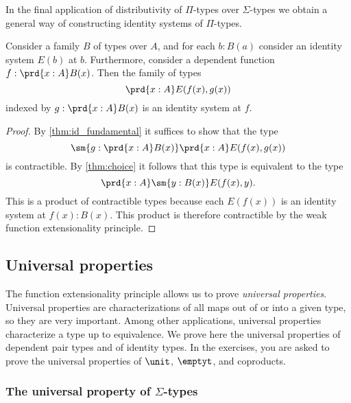 In the final application of distributivity of $\Pi$-types over $\Sigma$-types we obtain a general way of constructing identity systems of $\Pi$-types.

\begin{thm}\label{cor:Eq-Pi}
  Consider a family $B$ of types over $A$, and for each $b:B(a)$ consider an identity system $E(b)$ at $b$. Furthermore, consider a dependent function $f:\prd{x:A}B(x)$. Then the family of types
  \begin{equation*}
    \prd{x:A}E(f(x),g(x))
  \end{equation*}
  indexed by $g:\prd{x:A}B(x)$ is an identity system at $f$.
\end{thm}

\begin{proof}
  By \cref{thm:id_fundamental} it suffices to show that the type
  \begin{equation*}
    \sm{g:\prd{x:A}B(x)}\prd{x:A}E(f(x),g(x))
  \end{equation*}
  is contractible. By \cref{thm:choice} it follows that this type is equivalent to the type
  \begin{equation*}
    \prd{x:A}\sm{y:B(x)}E(f(x),y).
  \end{equation*}
  This is a product of contractible types because each $E(f(x))$ is an identity system at $f(x):B(x)$. This product is therefore contractible by the weak function extensionality principle.
\end{proof}

\subsection{Universal properties}
The function extensionality principle allows us to prove \emph{universal properties}. Universal properties are characterizations of all maps out of or into a given type, so they are very important. Among other applications, universal properties characterize a type up to equivalence. We prove here the universal properties of dependent pair types and of identity types. In the exercises, you are asked to prove the universal properties of $\unit$, $\emptyt$, and coproducts.

\subsubsection*{The universal property of $\Sigma$-types}


